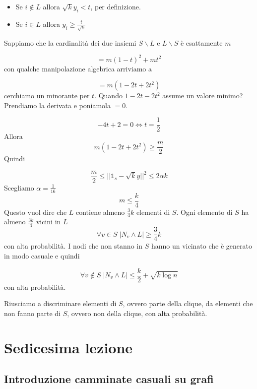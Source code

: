 \documentclass[12pt]{report}
\begin{document}
\begin{itemize}
    \item Se $i \notin L$ allora $\sqrt{k}y_i < t$, per definizione.
    \item Se $i \in L$ allora $y_i \geq \frac{t}{\sqrt{k}}$
\end{itemize}
Sappiamo che la cardinalità dei due insiemi $S\backslash L$ e $L \backslash S$ è esattamente $m$

$$= m(1-t)^2 + mt^2$$
con qualche manipolazione algebrica arriviamo a

$$= m(1-2t + 2t^2)$$
cerchiamo un minorante per $t$. Quando $1 - 2t - 2t^2$ assume un valore minimo? Prendiamo la derivata e poniamola $= 0$.

$$-4t + 2 = 0 \Leftrightarrow t = \frac{1}{2} $$
Allora
$$m(1-2t + 2t^2) \geq \frac{m}{2}$$
Quindi

$$\frac{m}{2} \leq || \mathds{1}_s - \sqrt{k}y||^2 \leq 2 \alpha k$$
Scegliamo $\alpha = \frac{1}{16}$
$$m \leq \frac{k}{4}$$
Questo vuol dire che $L$ contiene almeno $\frac{3}{4}k$ elementi di $S$. Ogni elemento di $S$ ha almeno $\frac{3k}{4}$ vicini in $L$
$$\forall v \in S \; |N_v \land L| \geq \frac{3}{4}k$$
con alta probabilità. I nodi che non stanno in $S$ hanno un vicinato che è generato in modo casuale e quindi

$$\forall v \notin S \; |N_v \land L| \leq \frac{k}{2} + \sqrt{k \log{n}}$$
con alta probabilità.


Riusciamo a discriminare elementi di $S$, ovvero parte della clique, da elementi che non fanno parte di $S$, ovvero non della clique, con alta probabilità.

\chapter{Sedicesima lezione}

\section{Introduzione camminate casuali su grafi}
\end{document}
